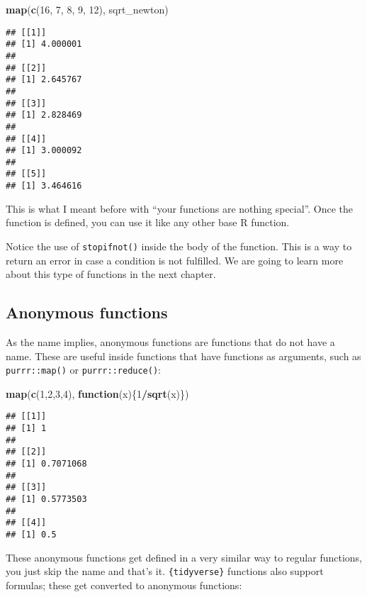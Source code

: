 \documentclass[
]{article}
\newenvironment{Shaded}{\begin{snugshade}}{\end{snugshade}}
\newcommand{\ControlFlowTok}[1]{\textcolor[rgb]{0.13,0.29,0.53}{\textbf{#1}}}
\newcommand{\DecValTok}[1]{\textcolor[rgb]{0.00,0.00,0.81}{#1}}
\newcommand{\KeywordTok}[1]{\textcolor[rgb]{0.13,0.29,0.53}{\textbf{#1}}}
\newcommand{\NormalTok}[1]{#1}
\newcommand{\OperatorTok}[1]{\textcolor[rgb]{0.81,0.36,0.00}{\textbf{#1}}}
\begin{document}
\begin{Shaded}
\begin{Highlighting}[]
\KeywordTok{map}\NormalTok{(}\KeywordTok{c}\NormalTok{(}\DecValTok{16}\NormalTok{, }\DecValTok{7}\NormalTok{, }\DecValTok{8}\NormalTok{, }\DecValTok{9}\NormalTok{, }\DecValTok{12}\NormalTok{), sqrt\_newton)}
\end{Highlighting}
\end{Shaded}

\begin{verbatim}
## [[1]]
## [1] 4.000001
## 
## [[2]]
## [1] 2.645767
## 
## [[3]]
## [1] 2.828469
## 
## [[4]]
## [1] 3.000092
## 
## [[5]]
## [1] 3.464616
\end{verbatim}

This is what I meant before with ``your functions are nothing special''. Once the function is
defined, you can use it like any other base R function.

Notice the use of \texttt{stopifnot()} inside the body of the function. This is a way to return an error
in case a condition is not fulfilled. We are going to learn more about this type of functions
in the next chapter.

\hypertarget{anonymous-functions}{%
\subsection{Anonymous functions}\label{anonymous-functions}}

As the name implies, anonymous functions are functions that do not have a name. These are useful inside
functions that have functions as arguments, such as \texttt{purrr::map()} or \texttt{purrr::reduce()}:

\begin{Shaded}
\begin{Highlighting}[]
\KeywordTok{map}\NormalTok{(}\KeywordTok{c}\NormalTok{(}\DecValTok{1}\NormalTok{,}\DecValTok{2}\NormalTok{,}\DecValTok{3}\NormalTok{,}\DecValTok{4}\NormalTok{), }\ControlFlowTok{function}\NormalTok{(x)\{}\DecValTok{1}\OperatorTok{/}\KeywordTok{sqrt}\NormalTok{(x)\})}
\end{Highlighting}
\end{Shaded}

\begin{verbatim}
## [[1]]
## [1] 1
## 
## [[2]]
## [1] 0.7071068
## 
## [[3]]
## [1] 0.5773503
## 
## [[4]]
## [1] 0.5
\end{verbatim}

These anonymous functions get defined in a very similar way to regular functions, you just skip the
name and that's it. \texttt{\{tidyverse\}} functions also support formulas; these get converted to anonymous functions:
\end{document}
